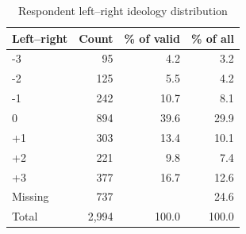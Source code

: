 \begin{table}[htbp]
\centering
\caption{Respondent left--right ideology distribution}
\begin{tabular}{lrrr}
\toprule
Left--right & Count & \% of valid & \% of all \\
\midrule
-3 & 95 & 4.2 & 3.2 \\
-2 & 125 & 5.5 & 4.2 \\
-1 & 242 & 10.7 & 8.1 \\
0 & 894 & 39.6 & 29.9 \\
+1 & 303 & 13.4 & 10.1 \\
+2 & 221 & 9.8 & 7.4 \\
+3 & 377 & 16.7 & 12.6 \\
\midrule
Missing & 737 &  & 24.6 \\
\midrule
Total & 2,994 & 100.0 & 100.0 \\
\bottomrule
\end{tabular}
\end{table}
